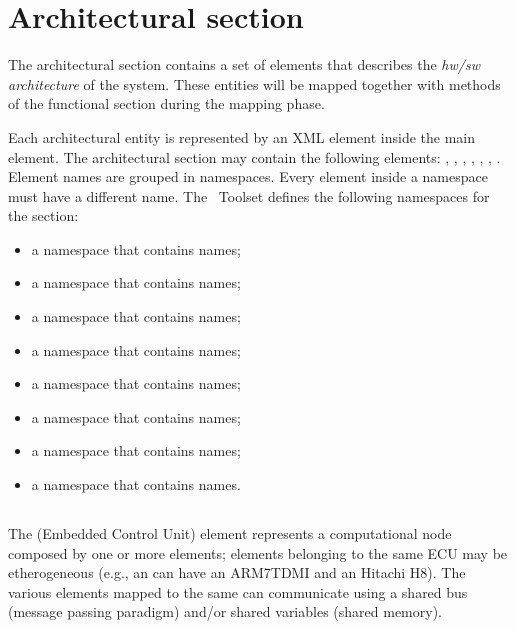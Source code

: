 \section{Architectural section}
\label{sec:Architectural-section}

The architectural section contains a set of elements that describes
the \emph{hw/sw architecture} of the system. These entities will be
mapped together with methods of the functional section during the
mapping phase.

Each architectural entity is represented by an XML element inside the
main  element. The architectural section may
contain the following elements: , ,
, , , ,
. Element names are grouped in namespaces. Every element
inside a namespace must have a different name. The \rtd\ Toolset
defines the following namespaces for the 
section:

\begin{itemize}
\item a namespace that contains  names;
\item a namespace that contains  names;
\item a namespace that contains  names;
\item a namespace that contains  names;
\item a namespace that contains  names;
\item a namespace that contains  names;
\item a namespace that contains  names;
\item a namespace that contains  names.
\end{itemize}


\subsection{}

The  (Embedded Control Unit) element represents a
computational node composed by one or more  elements;
 elements belonging to the same ECU may be etherogeneous
(e.g., an  can have an ARM7TDMI and an Hitachi H8). The
various  elements mapped to the same  can
communicate using a shared bus (message passing paradigm) and/or
shared variables (shared memory).

